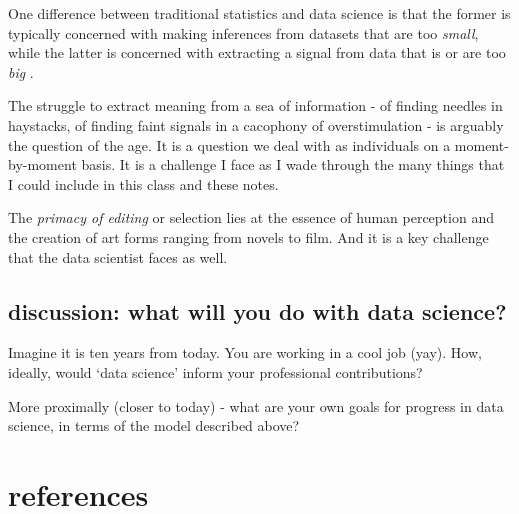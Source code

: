 \documentclass[
  openany]{book}
\begin{document}
One difference between traditional statistics and data science is that the former is typically concerned with making inferences from datasets that are too \emph{small}, while the latter is concerned with extracting a signal from data that is or are too \emph{big} \citep{donoho2017}.

The struggle to extract meaning from a sea of information - of finding needles in haystacks, of finding faint signals in a cacophony of overstimulation - is arguably the question of the age. It is a question we deal with as individuals on a moment-by-moment basis. It is a challenge I face as I wade through the many things that I could include in this class and these notes.

The \emph{primacy of editing} or selection lies at the essence of human perception and the creation of art forms ranging from novels to film. And it is a key challenge that the data scientist faces as well.

\hypertarget{discussion-what-will-you-do-with-data-science}{%
\section{discussion: what will you do with data science?}\label{discussion-what-will-you-do-with-data-science}}

Imagine it is ten years from today. You are working in a cool job (yay). How, ideally, would `data science' inform your professional contributions?

More proximally (closer to today) - what are your own goals for progress in data science, in terms of the model described above?

\hypertarget{references}{%
\chapter{references}\label{references}}

\hypertarget{section-1}{%
\chapter*{}\label{section-1}}

  
\end{document}
